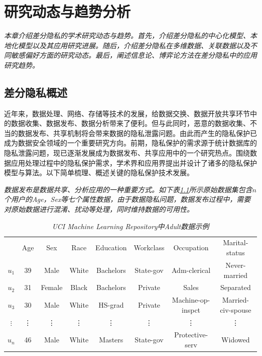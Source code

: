 \chapter{研究动态与趋势分析}\label{chapter02}

{\em 本章介绍差分隐私的学术研究动态与趋势。首先，介绍差分隐私的中心化模型、本地化模型以及其应用研究进展。随后，介绍差分隐私在多维数据、关联数据以及不同敏感偏好方面的研究动态。最后，阐述信息论、博弈论方法在差分隐私中的应用研究趋势。}

\section{差分隐私概述}\label{sec:chapter2_dp_guideline}

近年来，数据处理、网络、存储等技术的发展，给数据交换、数据开放共享环节中的数据收集、数据发布、数据分析带来了便利。但与此同时，恶意的数据收集、不当的数据发布、共享机制将会带来数据的隐私泄露问题。由此而产生的隐私保护已成为数据安全领域的一个重要研究方向。前期，隐私保护的需求源于统计数据库的隐私泄露问题，现已逐渐发展成为数据发布、共享应用中的一个研究热点。围绕数据应用处理过程中的隐私保护需求，学术界和应用界提出并设计了诸多的隐私保护模型与算法。以下简单梳理、概述关键的隐私保护技术发展。

\begin{example}\label{example:01}{\em 数据发布是数据共享、分析应用的一种重要方式。如下表\ref{tab:origin}所示原始数据集包含$n$个用户的Age，Sex等七个属性数据，由于数据隐私问题，数据发布过程中，需要对原始数据进行混淆、扰动等处理，同时维持数据的可用性。
}
\begin{table}[h!]
\small
\centering\caption{{\em UCI Machine Learning Repository中Adult数据示例}}
\begin{tabular}{c|c|c|c|c|c|c|c|}
  \cline{2-8}
   & Age & Sex & Race & Education &Workclass &Occupation &Marital-status \\
  \cline{2-8}
  $u_1$ & 39 & Male & White & Bachelors& State-gov & Adm-clerical & Never-married \\
  $u_2$ & 31 & Female & Black & Bachelors &  Private &  Sales & Separated\\
  $u_{3}$ & 30 & Male& White & HS-grad  & Private  & Machine-op-inspct  & Married-civ-spouse\\
  $\vdots$ & \vdots & \vdots & \vdots & \vdots & \vdots & \vdots & \vdots \\
  $u_n$ & 46 & Male & White & Masters  & State-gov  & Protective-serv  &Widowed\\
  \cline{2-8}
\end{tabular}\label{tab:origin}
\end{table}
\end{example}


